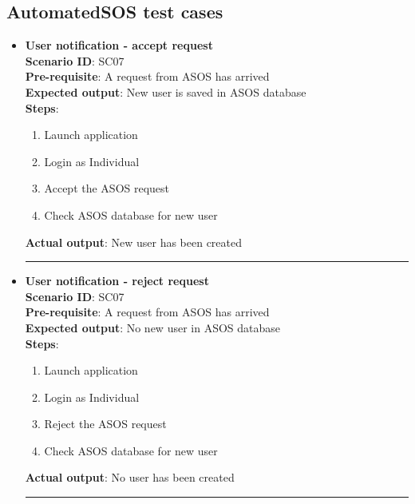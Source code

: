 \documentclass[a4paper, hidelinks, 12pt]{report}
\begin{document}
\subsection{AutomatedSOS test cases}
\begin{itemize}
		\item{\textbf{User notification - accept request}} \\
		\textbf{Scenario ID}: SC07 \\
		\textbf{Pre-requisite}: A request from ASOS has arrived \\
		\textbf{Expected output}: New user is saved in ASOS database\\
		\textbf{Steps}:
		\begin{enumerate}
			\item{Launch application}
			\item{Login as Individual}
			\item{Accept the ASOS request}
			\item{Check ASOS database for new user}
		\end{enumerate}
		\textbf{Actual output}: New user has been created \\
		\rule{\linewidth}{0.4pt}

		\item{\textbf{User notification - reject request}} \\
		\textbf{Scenario ID}: SC07 \\
		\textbf{Pre-requisite}: A request from ASOS has arrived \\
		\textbf{Expected output}: No new user in ASOS database\\
		\textbf{Steps}:
		\begin{enumerate}
			\item{Launch application}
			\item{Login as Individual}
			\item{Reject the ASOS request}
			\item{Check ASOS database for new user}
		\end{enumerate}
		\textbf{Actual output}: No user has been created \\
		\rule{\linewidth}{0.4pt}


\end{itemize}
\end{document}
